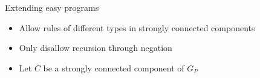 \begin{frame}{\alert{Extending} easy programs}
  \begin{itemize}
    \vfill
    \item Allow rules of different types in strongly connected components %
    \medskip
    \item Only disallow recursion through negation
    \bigskip
    \bigskip
    \pause
    \item Let $C$ be a strongly connected component of $G_P$
    \vfill
  \end{itemize}
\end{frame}
%
%

